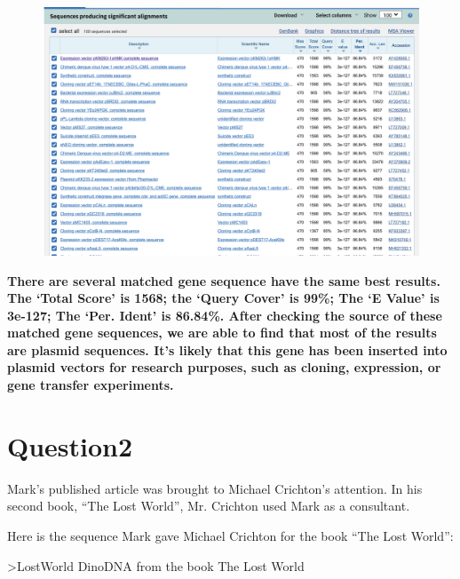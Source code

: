 \documentclass{article}
\begin{document}
\begin{figure}[H]
    \centering
    \includegraphics[width=1\textwidth]{q1.png}
\end{figure}


\textbf{There are several matched gene sequence have the same best results. The `Total Score' is 1568; the `Query Cover' is 99\%; The ‘E Value’ is 3e-127; The ‘Per. Ident’ is 86.84\%. After checking the source of these matched gene sequences, we are able to find that most of the results are plasmid sequences. 
It’s likely that this gene has been inserted into plasmid vectors for research purposes, such as cloning, expression, or gene transfer experiments.
}  %

\section{Question2}

Mark's published article was brought to Michael Crichton's attention. In his second book, ``The Lost World'', 
Mr. Crichton used Mark as a consultant. 

Here is the sequence Mark gave Michael Crichton for the book ``The Lost World'': 

>LostWorld DinoDNA from the book The Lost World
\end{document}
